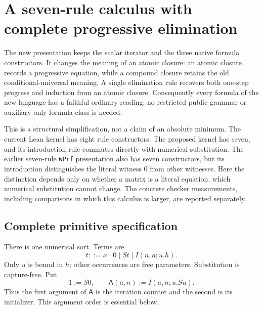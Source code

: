 \providecommand{\llbracket}{[\![}
\providecommand{\rrbracket}{]\!]}
\section{A seven-rule calculus with complete progressive elimination}
\label{sec:new-calculus}

The new presentation keeps the scalar iterator and the three native formula
constructors.  It changes the meaning of an atomic closure: an atomic closure
records a progressive equation, while a compound closure retains the old
conditional-universal meaning.  A single elimination rule recovers both
one-step progress and induction from an atomic closure.  Consequently every
formula of the new language has a faithful ordinary reading; no restricted
public grammar or auxiliary-only formula class is needed.

This is a structural simplification, not a claim of an absolute minimum.  The
current Lean kernel has eight rule constructors.  The proposed kernel has
seven, and its introduction rule commutes directly with numerical
substitution.  The earlier seven-rule \texttt{WPrf} presentation also has seven
constructors, but its introduction distinguishes the literal witness $0$ from
other witnesses.  Here the distinction depends only on whether a matrix is a
literal equation, which numerical substitution cannot change.  The concrete
checker measurements, including comparisons in which this calculus is larger,
are reported separately.\cite{native,witness}

\subsection{Complete primitive specification}
\label{subsec:new-specification}

There is one numerical sort.  Terms are
\[
 t ::= x\mid 0\mid St\mid I(n,a;u.h).
\]
Only $u$ is bound in $h$; other occurrences are free parameters.  Substitution
is capture-free.  Put
\begin{equation}
 1:=S0,\qquad
 \mathsf A(a,n):=I(a,n;u.Su).
 \label{eq:new-add}
\end{equation}
Thus the first argument of $\mathsf A$ is the iteration counter and the
second is its initializer.  This argument order is essential below.

